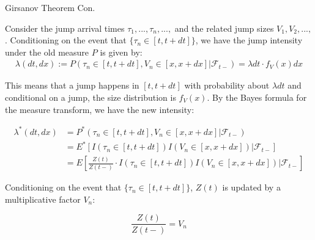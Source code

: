 \documentclass{beamer}
\begin{document}
\begin{frame}{Girsanov Theorem Con.}

    {\footnotesize \footnotesize
    \par Consider the jump arrival times $\tau_1, ..., \tau_n, ...,$ and the related jump sizes $V_1, V_2, ...,$. 
    Conditioning on the event that $\{\tau_n \in [t, t + dt]\}$, we have the jump intensity under the old measure $P$ is given by:
    \begin{align*}
        \lambda(dt, dx) := P(\tau_n \in [t, t + dt],  V_n \in [x, x + dx] | \mathcal{F}_{t-}) = \lambda dt \cdot f_V(x) dx
    \end{align*}
    \par This means that a jump happens in \([t, t + dt]\) with probability about \(\lambda dt\) and 
    conditional on a jump, the size distribution is \(f_V(x)\). By the Bayes formula for the measure transform, we have the new intensity:

    \[
    \begin{aligned}
    \lambda^*(dt, dx) &= P^*(\tau_n \in [t, t + dt],  V_n \in [x, x + dx] | \mathcal{F}_{t-}) \\
    &= E^*[I(\tau_n \in [t, t + dt]) I(V_n \in [x, x + dx]) | \mathcal{F}_{t-}] \\
    &= E \left[ \frac{Z(t)}{Z(t-)} \cdot I(\tau_n \in [t, t + dt]) I(V_n \in [x, x + dx]) | \mathcal{F}_{t-} \right]
    \end{aligned}
    \]
    \par Conditioning on the event that $\{\tau_n \in [t, t + dt]\}$, \( Z(t) \) is updated by a multiplicative factor \( V_n \):

    \[
    \frac{Z(t)}{Z(t-)} = V_n
    \]
    }
    
\end{frame}
\end{document}
